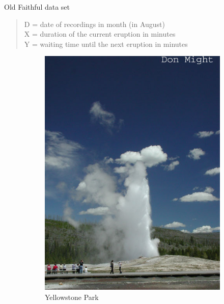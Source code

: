 \documentclass[10pt]{beamer}
\begin{document}
\begin{frame}{Old Faithful data set}

\begin{quote}
D = date of recordings in month (in August) \\
X = duration of the current eruption in minutes \\
Y = waiting time until the next eruption in minutes \\
\end{quote}

\begin{figure}
        \centering
        \begin{subfigure}[b]{0.33\textwidth}
                \includegraphics[width=\textwidth]{images/of1.jpg}
                \caption{Yellowstone Park}                
        \end{subfigure}    
        \begin{subfigure}[b]{0.6\textwidth}

\end{subfigure}
\end{figure}
\end{frame}
\end{document}
